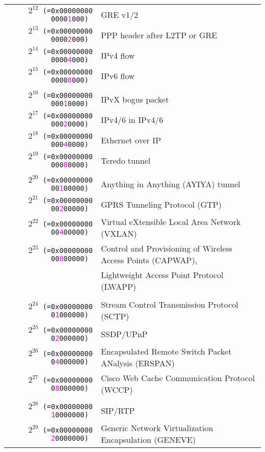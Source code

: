 \documentclass[documentation]{subfiles}
\begin{document}
\begin{longtable}{>{\tt}rl}
    \\
    $2^{12}$ (=0x00000000 0000\textcolor{magenta}{1}000) & GRE v1/2\\
    $2^{13}$ (=0x00000000 0000\textcolor{magenta}{2}000) & PPP header after L2TP or GRE\\
    $2^{14}$ (=0x00000000 0000\textcolor{magenta}{4}000) & IPv4 flow\\
    $2^{15}$ (=0x00000000 0000\textcolor{magenta}{8}000) & IPv6 flow\\
    \\
    $2^{16}$ (=0x00000000 000\textcolor{magenta}{1}0000) & IPvX bogus packet\\
    $2^{17}$ (=0x00000000 000\textcolor{magenta}{2}0000) & IPv4/6 in IPv4/6\\
    $2^{18}$ (=0x00000000 000\textcolor{magenta}{4}0000) & Ethernet over IP\\
    $2^{19}$ (=0x00000000 000\textcolor{magenta}{8}0000) & Teredo tunnel\\
    \\
    $2^{20}$ (=0x00000000 00\textcolor{magenta}{1}00000) & Anything in Anything (AYIYA) tunnel\\
    $2^{21}$ (=0x00000000 00\textcolor{magenta}{2}00000) & GPRS Tunneling Protocol (GTP)\\
    $2^{22}$ (=0x00000000 00\textcolor{magenta}{4}00000) & Virtual eXtensible Local Area Network (VXLAN)\\
    $2^{23}$ (=0x00000000 00\textcolor{magenta}{8}00000) & Control and Provisioning of Wireless Access Points (CAPWAP),\\
                                                         & Lightweight Access Point Protocol (LWAPP)\\
    \\
    $2^{24}$ (=0x00000000 0\textcolor{magenta}{1}000000) & Stream Control Transmission Protocol (SCTP)\\
    $2^{25}$ (=0x00000000 0\textcolor{magenta}{2}000000) & SSDP/UPnP\\
    $2^{26}$ (=0x00000000 0\textcolor{magenta}{4}000000) & Encapsulated Remote Switch Packet ANalysis (ERSPAN)\\
    $2^{27}$ (=0x00000000 0\textcolor{magenta}{8}000000) & Cisco Web Cache Communication Protocol (WCCP)\\
    \\
    $2^{28}$ (=0x00000000 \textcolor{magenta}{1}0000000) & SIP/RTP\\
    $2^{29}$ (=0x00000000 \textcolor{magenta}{2}0000000) & Generic Network Virtualization Encapsulation (GENEVE)\\

\end{longtable}
\end{document}
